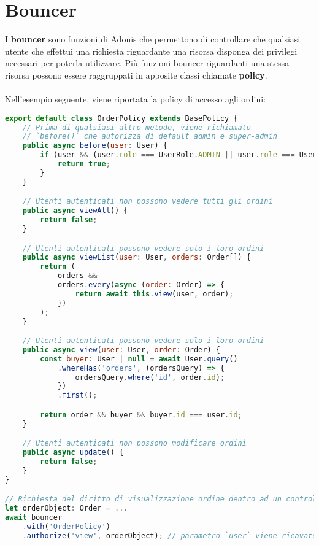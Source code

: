 \section{Bouncer}
\label{impl:bouncer}
I \textbf{bouncer} sono funzioni di Adonis che permettono di controllare che qualsiasi utente che effettui una richiesta riguardante una risorsa disponga dei privilegi necessari per poterla utilizzare. Più funzioni bouncer riguardanti una stessa risorsa possono essere raggruppati in apposite classi chiamate \textbf{policy}.
\\\\
Nell'esempio seguente, viene riportata la policy di accesso agli ordini:
\begin{lstlisting}[language=JavaScript]
export default class OrderPolicy extends BasePolicy {
    // Prima di qualsiasi altro metodo, viene richiamato
    // `before()` che autorizza di default admin e super-admin
    public async before(user: User) {
        if (user && (user.role === UserRole.ADMIN || user.role === UserRole.SUPERADMIN)) {
            return true;
        }
    }

    // Utenti autenticati non possono vedere tutti gli ordini
    public async viewAll() {
        return false;
    }

    // Utenti autenticati possono vedere solo i loro ordini
    public async viewList(user: User, orders: Order[]) {
        return (
            orders &&
            orders.every(async (order: Order) => {
                return await this.view(user, order);
            })
        );
    }

    // Utenti autenticati possono vedere solo i loro ordini
    public async view(user: User, order: Order) {
        const buyer: User | null = await User.query()
            .whereHas('orders', (ordersQuery) => {
                ordersQuery.where('id', order.id);
            })
            .first();

        return order && buyer && buyer.id === user.id;
    }

    // Utenti autenticati non possono modificare ordini
    public async update() {
        return false;
    }
}

// Richiesta del diritto di visualizzazione ordine dentro ad un controller
let orderObject: Order = ...
await bouncer
    .with('OrderPolicy')
    .authorize('view', orderObject); // parametro `user` viene ricavato automaticamente
\end{lstlisting}

